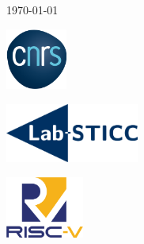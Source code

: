 \begin{titlepage}
    {\today}\\[1.5cm] %

    \vspace{5.2cm}
    \begin{minipage}{0.33\textwidth}%
        \begin{flushleft}%
            \includegraphics[height=2cm]{images/icon/cnrs.png} %
        \end{flushleft}
    \end{minipage}
    \begin{minipage}{0.3\textwidth}%
        \begin{center}%
            \includegraphics[height=1.95cm]{images/icon/labsticc.png} %
        \end{center}
    \end{minipage}
    \begin{minipage}{0.33\textwidth}%
        \begin{flushright}%
            \includegraphics[height=2cm]{images/icon/riscv.png} %
        \end{flushright}
    \end{minipage}


    \vfill %

\end{titlepage}